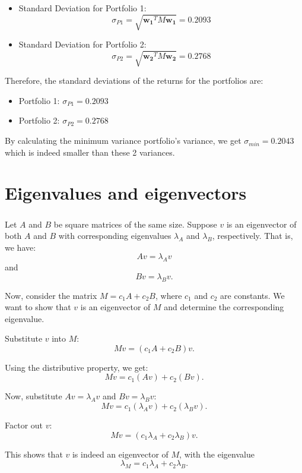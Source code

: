 \documentclass{article}
\begin{document}
\begin{itemize}
    \item Standard Deviation for Portfolio 1:
          \[
              \sigma_{P1} = \sqrt{\mathbf{w_1}^T M \mathbf{w_1}} = 0.2093
          \]

    \item Standard Deviation for Portfolio 2:
          \[
              \sigma_{P2} = \sqrt{\mathbf{w_2}^T M \mathbf{w_2}} = 0.2768
          \]
\end{itemize}

Therefore, the standard deviations of the returns for the portfolios are:
\begin{itemize}
    \item Portfolio 1: \( \sigma_{P1} = 0.2093 \)
    \item Portfolio 2: \( \sigma_{P2} = 0.2768 \)
\end{itemize}
By calculating the minimum variance portfolio's variance,
we get $\sigma_{min} = 0.2043$ which is indeed smaller than these 2 variances.


\part*{Eigenvalues and eigenvectors}
\section{}
Let \( A \) and \( B \) be square matrices of the same size. Suppose \( v \) is an eigenvector of both \( A \) and \( B \) with corresponding eigenvalues \( \lambda_A \) and \( \lambda_B \), respectively. That is, we have:
\[
    A v = \lambda_A v
\]
and
\[
    B v = \lambda_B v.
\]

Now, consider the matrix \( M = c_1 A + c_2 B \), where \( c_1 \) and \( c_2 \) are constants. We want to show that \( v \) is an eigenvector of \( M \) and determine the corresponding eigenvalue.

Substitute \( v \) into \( M \):
\[
    M v = (c_1 A + c_2 B) v.
\]

Using the distributive property, we get:
\[
    M v = c_1 (A v) + c_2 (B v).
\]

Now, substitute \( A v = \lambda_A v \) and \( B v = \lambda_B v \):
\[
    M v = c_1 (\lambda_A v) + c_2 (\lambda_B v).
\]

Factor out \( v \):
\[
    M v = (c_1 \lambda_A + c_2 \lambda_B) v.
\]

This shows that \( v \) is indeed an eigenvector of \( M \), with the eigenvalue
\[
    \lambda_M = c_1 \lambda_A + c_2 \lambda_B.
\]
\end{document}
